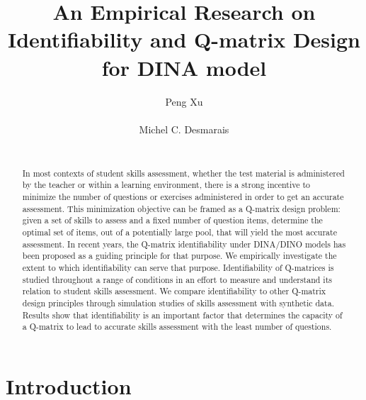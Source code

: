 \documentclass{edm_template}
\begin{document}
\title{An Empirical Research on Identifiability and Q-matrix Design for DINA model}
\author{
\alignauthor
Peng Xu\\
       \\
\alignauthor
Michel C. Desmarais\\
       \\
}
\maketitle

\begin{abstract}
In most contexts of student skills assessment, whether the test material is administered by the teacher or within a learning environment, there is a strong incentive to minimize the number of questions or exercises administered in order to get an accurate assessment.  This minimization objective can be framed as a Q-matrix design problem: given a set of skills to assess and a fixed number of question items, determine the optimal set of items, out of a potentially large pool, that will yield the most accurate assessment.  In recent years, the Q-matrix identifiability under DINA/DINO models has been proposed as a guiding principle for that purpose.  We empirically investigate the extent to which identifiability can serve that purpose. Identifiability of Q-matrices is studied throughout a range of conditions in an effort to measure and understand its relation to student skills assessment.  We compare identifiability to other Q-matrix design principles through simulation studies of skills assessment with synthetic data.  Results show that identifiability is an important factor that determines the capacity of a Q-matrix to lead to accurate skills assessment with the least number of questions.
\end{abstract}

\section{Introduction}

\end{document}
